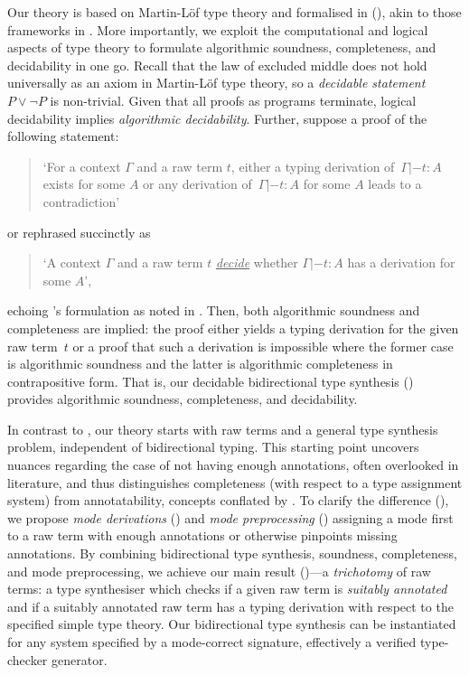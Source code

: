 Our theory is based on Martin-L\"of type theory and formalised in \Agda (), akin to those frameworks in .
More importantly, we exploit the computational and logical aspects of type theory to formulate algorithmic soundness, completeness, and decidability in one go. 
Recall that the law of excluded middle does not hold universally as an axiom in Martin-L\"of type theory, so a \emph{decidable statement} $P \vee \neg P$ is non-trivial.
Given that all proofs as programs terminate, logical decidability implies \emph{algorithmic decidability}.
Further, suppose a proof of the following statement:
\begin{quote}
  `For a context $\Gamma$ and a raw term $t$, either a typing derivation of\, $\Gamma |- t : A$ exists for some $A$ or any derivation of\, $\Gamma |- t : A$ for some $A$ leads to a contradiction'
\end{quote}
or rephrased succinctly as 
\begin{quote}
  `A context $\Gamma$ and a raw term $t$ \underline{\emph{decide}} whether $\Gamma |- t : A$ has a derivation for some $A$',
\end{quote}
echoing \citeauthor{Wadler2022}'s formulation as noted in .
Then, both algorithmic soundness and completeness are implied:
the proof either yields a typing derivation for the given raw term~$t$ or a proof that such a derivation is impossible where the former case is algorithmic soundness and the latter is algorithmic completeness in contrapositive form.
That is, our decidable bidirectional type synthesis () provides algorithmic soundness, completeness, and decidability. 

In contrast to \citeauthor{Wadler2022}, our theory starts with raw terms and a general type synthesis problem, independent of bidirectional typing.
This starting point uncovers nuances regarding the case of not having enough annotations, often overlooked in literature, and thus distinguishes completeness (with respect to a type assignment system) from annotatability, concepts conflated by \citet{Dunfield2021}. 
To clarify the difference (), we propose \emph{mode derivations} () and \emph{mode preprocessing} () assigning a mode first to a raw term with enough annotations or otherwise pinpoints missing annotations.
By combining bidirectional type synthesis, soundness, completeness, and mode preprocessing, we achieve our main result ()---a \emph{trichotomy} of raw terms: a type synthesiser which checks if a given raw term is \emph{suitably annotated} and if a suitably annotated raw term has a typing derivation with respect to the specified simple type theory.
Our bidirectional type synthesis can be instantiated for any system specified by a mode-correct signature, effectively a verified type-checker generator. 

